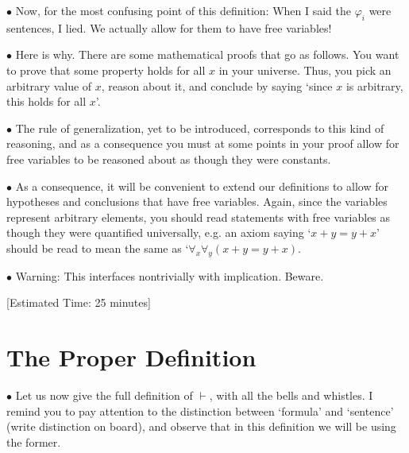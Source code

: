 \documentclass{article}
\newcommand\point[1]{\noindent \hspace{\labelsep} $\bullet$ #1 \smallskip}
\newcommand\timestamp[1]{\noindent \hspace{\labelsep} [Estimated Time: #1] \smallskip}
\begin{document}
\point{Now, for the most confusing point of this definition: When I said the $\varphi_i$ were sentences, I lied. We actually allow for them to have free variables!}

\point{Here is why. There are some mathematical proofs that go as follows. You want to prove that some property holds for all $x$ in your universe. Thus, you pick an arbitrary value of $x$, reason about it, and conclude by saying `since $x$ is arbitrary, this holds for all $x$'.}

\point{The rule of generalization, yet to be introduced, corresponds to this kind of reasoning, and as a consequence you must at some points in your proof allow for free variables to be reasoned about as though they were constants.}

\point{As a consequence, it will be convenient to extend our definitions to allow for hypotheses and conclusions that have free variables. Again, since the variables represent arbitrary elements, you should read statements with free variables as though they were quantified universally, e.g. an axiom saying `$x+y = y+x$' should be read to mean the same as `$\forall_x \forall_y (x+y = y+x)$.}

\point{Warning: This interfaces nontrivially with implication. Beware.}

\timestamp{25 minutes}

\section{The Proper Definition}

\point{Let us now give the full definition of $\vdash$, with all the bells and whistles. I remind you to pay attention to the distinction between `formula' and `sentence' (write distinction on board), and observe that in this definition we will be using the former.}
\end{document}
